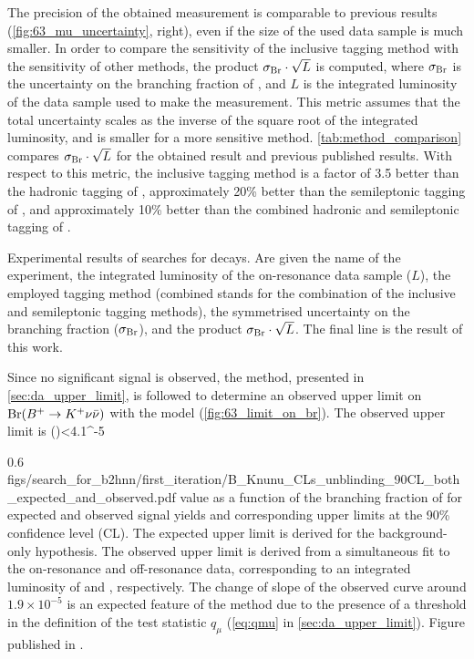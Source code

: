 The precision of the obtained measurement is comparable to previous results (\cref{fig:63_mu_uncertainty}, right), even if the size of the used data sample is much smaller.
In order to compare the sensitivity of the inclusive tagging method with the sensitivity of other methods, the product $\sigma_{\mathrm{\mathrm{Br}}}\cdot\sqrt{L}$ is computed, where $\sigma_{\mathrm{\mathrm{Br}}}$ is the uncertainty on the branching fraction of \BKpnn, and $L$ is the integrated luminosity of the data sample used to make the measurement.
This metric assumes that the total uncertainty scales as the inverse of the square root of the integrated luminosity, and is smaller for a more sensitive method.
\cref{tab:method_comparison} compares $\sigma_{\mathrm{\mathrm{Br}}}\cdot\sqrt{L}$ for the obtained result and previous published results.
With respect to this metric, the inclusive tagging method is a factor of 3.5 better than the hadronic tagging of \cite{Belle:2013tnz}, approximately 20\% better than the semileptonic tagging of \cite{Belle:2017oht}, and approximately 10\% better than the combined hadronic and semileptonic tagging of \cite{BaBar:2013npw}. 

{Experimental results of searches for \BKpnn decays.
Are given the name of the experiment, the integrated luminosity of the on-resonance data sample ($L$), the employed tagging method (combined stands for the combination of the inclusive and semileptonic tagging methods), the symmetrised uncertainty on the \BKpnn branching fraction ($\sigma_{\mathrm{\mathrm{Br}}}$), and the product $\sigma_{\mathrm{\mathrm{Br}}}\cdot\sqrt{L}$.
The final line is the result of this work.
}

Since no significant signal is observed, the \CLs method, presented in \cref{sec:da_upper_limit}, is followed to determine an observed upper limit on $\mathrm{\mathrm{Br}}(B^+\rightarrow K^+\nu\bar{\nu})$ with the \pyhf model (\cref{fig:63_limit_on_br}).
The observed upper limit is
\be
\mathrm{\Br}(\BKpnn)<4.1^{-5}\hspace{1cm}
\ee

{0.6}
{figs/search_for_b2hnn/first_iteration/B_Knunu_CLs_unblinding_90CL_both_expected_and_observed.pdf}
{
\CLs value as a function of the branching fraction of \BKpnn for expected and observed signal yields and corresponding upper limits at the 90\% confidence level (CL).
The expected upper limit is derived for the background-only hypothesis.
The observed upper limit is derived from a simultaneous fit to the on-resonance and off-resonance data, corresponding to an integrated luminosity of \lumionpartial and \lumioffpartial, respectively.
The change of slope of the observed \CLs curve around $1.9\times10^{-5}$ is an expected feature of the \CLs method due to the presence of a threshold in the definition of the test statistic $q_\mu$ (\cref{eq:qmu} in \cref{sec:da_upper_limit}).
Figure published in \cite{Belle-II:2021rof}.
}

